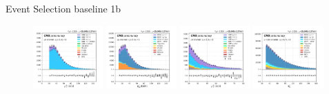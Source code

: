 \begin{frame}{Event Selection baseline 1b}
    \begin{figure}
        \centering
        \includegraphics[width=0.24\textwidth]{chapters/Analysis/sectionPlots/figures/kinematics_pickles/emu/1b/emu_1b_lepton2_pt.pdf}
        \includegraphics[width=0.24\textwidth]{chapters/Analysis/sectionPlots/figures/kinematics_pickles/mumu/1b/mumu_1b_lepton2_pt.pdf}
        \includegraphics[width=0.24\textwidth]{chapters/Analysis/sectionPlots/figures/kinematics_pickles/mutau/1b/mutau_1b_lepton2_pt.pdf}
        \includegraphics[width=0.24\textwidth]{chapters/Analysis/sectionPlots/figures/kinematics_pickles/mu4j/1b/mu4j_1b_lepton1_pt.pdf}


\end{figure}
\end{frame}
